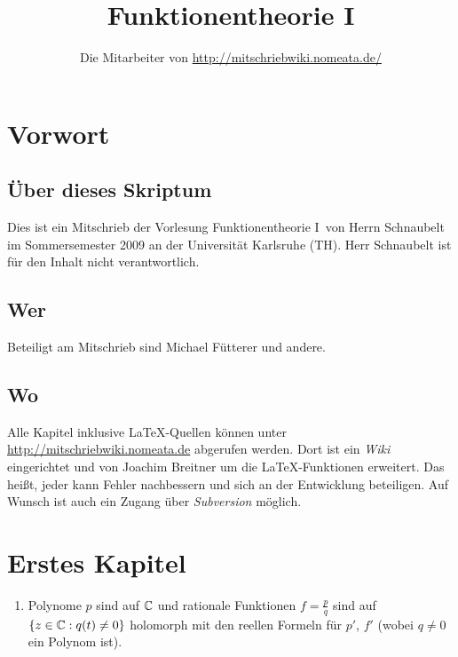 \documentclass[a4paper,twoside,DIV15,BCOR12mm]{scrbook}
\author{Die Mitarbeiter von \url{http://mitschriebwiki.nomeata.de/}}
\title{Funktionentheorie I}
\newcommand{\C}{\set{C}} %
\begin{document}
\maketitle

\renewcommand{\thechapter}{\Roman{chapter}}
\tableofcontents

\chapter{Vorwort}

\section{Über dieses Skriptum}
Dies ist ein Mitschrieb der Vorlesung \glqq Funktionentheorie I\grqq\ von Herrn Schnaubelt im
Sommersemester 2009 an der Universität Karlsruhe (TH).
Herr Schnaubelt ist für den Inhalt nicht verantwortlich.

\section{Wer}
Beteiligt am Mitschrieb sind Michael Fütterer und andere.

\section{Wo}
Alle Kapitel inklusive \LaTeX-Quellen können unter \url{http://mitschriebwiki.nomeata.de} abgerufen werden.
Dort ist ein \emph{Wiki} eingerichtet und von Joachim Breitner um die \LaTeX-Funktionen erweitert.
Das heißt, jeder kann Fehler nachbessern und sich an der Entwicklung
beteiligen. Auf Wunsch ist auch ein Zugang über \emph{Subversion} möglich.

\setcounter{chapter}{0}

\chapter{Erstes Kapitel}

\begin{bsp}
\begin{enumerate}
\item Polynome $p$ sind auf $\C$ und rationale Funktionen $f = \frac{p}{q}$ sind auf $\{z\in\C: q(t) \neq 0\}$ holomorph mit den reellen Formeln für $p'$, $f'$ (wobei $q \neq 0$ ein Polynom ist).
\end{enumerate}
\end{bsp}
\end{document}
